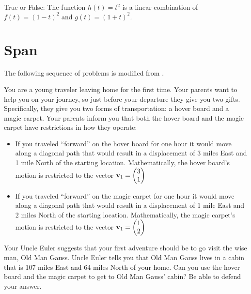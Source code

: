 \begin{problem}
    True or False: The function $h(t) = t^2$ is a linear combination of $f(t) = (1-t)^2$
    and $g(t) = (1+t)^2$.
\end{problem}
% 
%             


\newpage\section{Span}
The following sequence of problems is modified from \cite{carpet}.
\begin{problem}
    You are a young traveler leaving home for the first time.  Your parents want to help
    you on your journey, so just before your departure they give you two gifts.
    Specifically, they give you two forms of transportation: a hover board and a magic
    carpet.  Your parents inform you that both the hover board and the magic carpet have
    restrictions in how they operate:
    \begin{itemize}
        \item If you traveled ``forward'' on the hover board for one hour it would move along a
            diagonal path that would result in a displacement of 3 miles East and 1 mile
            North of the starting location.  Mathematically, the hover board's motion is
            restricted to the vector ${\bf v}_1 = \begin{pmatrix} 3\\1\end{pmatrix}$
        \item If you traveled ``forward'' on the magic carpet for one hour it would move along a
            diagonal path that would result in a displacement of 1 mile East and 2 miles
            North of the starting location.  Mathematically, the magic carpet's motion is
            restricted to the vector ${\bf v}_1 = \begin{pmatrix} 1\\2\end{pmatrix}$
    \end{itemize}
    Your Uncle Euler suggests that your first adventure should be to go visit the wise
    man, Old Man Gauss.  Uncle Euler tells you that Old Man Gauss lives in a cabin that is
    107 miles East and 64 miles North of your home.  Can you use the hover board and the
    magic carpet to get to Old Man Gauss' cabin?  Be able to defend your answer.
\end{problem}

